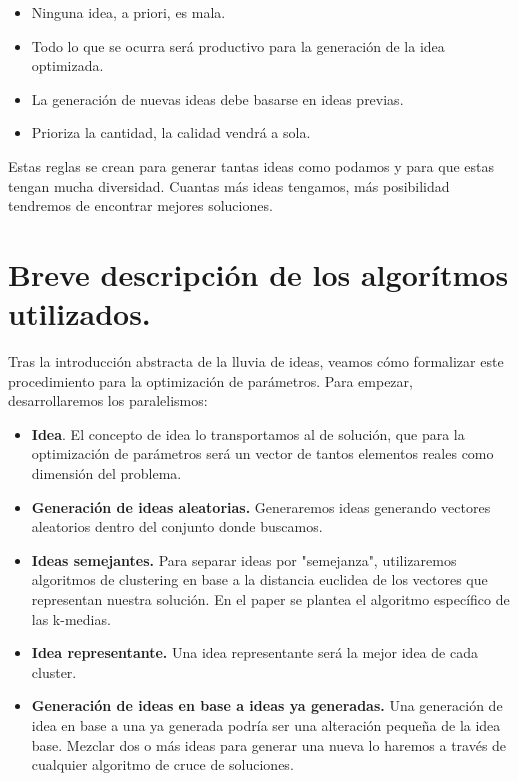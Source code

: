 \begin{itemize}
	\item Ninguna idea, a priori, es mala.
	\item Todo lo que se ocurra será productivo para la generación de la idea optimizada.
	\item La generación de nuevas ideas debe basarse en ideas previas.
	\item Prioriza la cantidad, la calidad vendrá a sola.
\end{itemize}

Estas reglas se crean para generar tantas ideas como podamos y para que estas tengan mucha diversidad. Cuantas más ideas tengamos, más posibilidad tendremos de encontrar mejores soluciones.

\newpage

\section{Breve descripción de los algorítmos utilizados.}

Tras la introducción abstracta de la lluvia de ideas, veamos cómo formalizar este procedimiento para la optimización de parámetros. Para empezar, desarrollaremos los paralelismos:\\

\begin{itemize}
	\item \textbf{Idea}. El concepto de idea lo transportamos al de solución, que para la optimización de parámetros será un vector de tantos elementos reales como dimensión del problema.
	
	\item \textbf{Generación de ideas aleatorias.} Generaremos ideas generando vectores aleatorios dentro del conjunto donde buscamos.
	
	\item \textbf{Ideas semejantes.} Para separar ideas por "semejanza", utilizaremos algoritmos de clustering en base a la distancia euclidea de los vectores que representan nuestra solución. En el paper se plantea el algoritmo específico de las k-medias.
	
	\item \textbf{Idea representante.} Una idea representante será la mejor idea de cada cluster.
	
	\item \textbf{Generación de ideas en base a ideas ya generadas.} Una generación de idea en base a una ya generada podría ser una alteración pequeña de la idea base. Mezclar dos o más ideas para generar una nueva lo haremos a través de cualquier algoritmo de cruce de soluciones.
	
\end{itemize}

